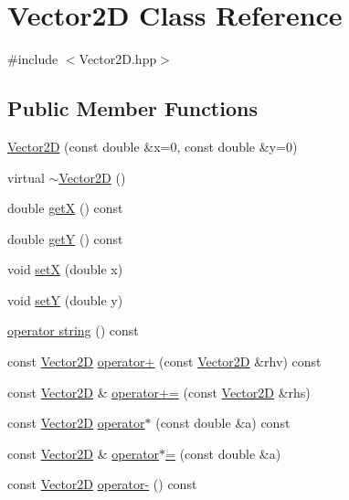 \hypertarget{class_vector2_d}{}\section{Vector2D Class Reference}
\label{class_vector2_d}


{\ttfamily \#include $<$Vector2\+D.\+hpp$>$}

\subsection*{Public Member Functions}
\begin{DoxyCompactItemize}
\item 
\hyperlink{class_vector2_d_affaf87a7d9ce6c6566c8fe0fe000dfae}{Vector2D} (const double \&x=0, const double \&y=0)
\item 
virtual \hyperlink{class_vector2_d_ac0f819527d3966874c4c9bb72ab9f67e}{$\sim$\+Vector2D} ()
\item 
double \hyperlink{class_vector2_d_a5957acade3579baa63807d625316d557}{getX} () const
\item 
double \hyperlink{class_vector2_d_a4ae19b97cfbc35850b9717a25ea83104}{getY} () const
\item 
void \hyperlink{class_vector2_d_aefc6ba44c9fbf5f877fbd70460a4dcaf}{setX} (double x)
\item 
void \hyperlink{class_vector2_d_a2f68870e57beb7116b457a143fee4362}{setY} (double y)
\item 
\hyperlink{class_vector2_d_aa5286e82a3c62dd101dd7203943bb0f0}{operator string} () const
\item 
const \hyperlink{class_vector2_d}{Vector2D} \hyperlink{class_vector2_d_a068660b7b836163e6a417c8fb283022b}{operator+} (const \hyperlink{class_vector2_d}{Vector2D} \&rhv) const
\item 
const \hyperlink{class_vector2_d}{Vector2D} \& \hyperlink{class_vector2_d_a5e4dc932362899c8e7bf8b0caea1c9a9}{operator+=} (const \hyperlink{class_vector2_d}{Vector2D} \&rhs)
\item 
const \hyperlink{class_vector2_d}{Vector2D} \hyperlink{class_vector2_d_a4931b15799ccc2432d472fff3ee76e39}{operator$\ast$} (const double \&a) const
\item 
const \hyperlink{class_vector2_d}{Vector2D} \& \hyperlink{class_vector2_d_a9ec785cca2a48d62596dfdbfa0546267}{operator$\ast$=} (const double \&a)
\item 
const \hyperlink{class_vector2_d}{Vector2D} \hyperlink{class_vector2_d_a03bb71dddee9f2d265410b932711b9a4}{operator-\/} () const

\end{DoxyCompactItemize}
